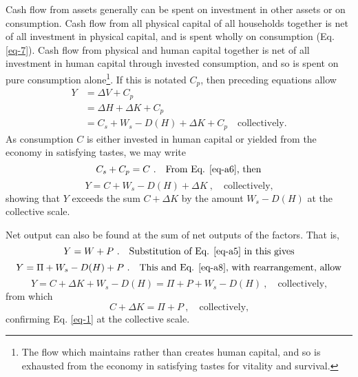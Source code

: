 \documentclass[a4paper,fleqn]{cas-sc}
\begin{document}
Cash flow from assets generally can be spent on investment in other assets or on consumption. Cash flow from all physical capital of all households together is net of all investment in physical capital, and is spent wholly on consumption (Eq. \eqref{eq-7}). Cash flow from physical and human capital together is net of all investment in human capital through invested consumption, and so is spent on pure consumption alone\footnote{The flow which maintains rather than creates human capital, and so is exhausted from the economy in satisfying tastes for vitality and survival.}. If this is notated $C_p$, then preceding equations allow
\begin{equation}
\begin{aligned}
Y &= \Delta V + C_p \\
&= \Delta H + \Delta K + C_p \\
&= C_s + W_s - D(H) + \Delta K + C_p \quad \text{collectively.} \label{eq-a6}
\end{aligned}
\end{equation}
As consumption $C$ is either invested in human capital or yielded from the economy in satisfying tastes, we may write
\begin{equation}
C_s + C_p = C \ . \quad \text{From Eq. \eqref{eq-a6}, then} \label{eq-a7}
\end{equation}
\vspace{-5ex}
\begin{equation}
Y = C + W_s - D(H) + \Delta K \ , \quad \text{collectively,} \label{eq-a8}
\end{equation}
showing that $Y$ exceeds the sum $C + \Delta K$ by the amount $W_s - D(H)$ at the collective scale.


Net output can also be found at the sum of net outputs of the factors. That is,
\begin{equation}
Y = W + P \ . \quad \text{Substitution of Eq. \eqref{eq-a5} in this gives} \label{eq-a9}
\end{equation}
\vspace{-5ex}
\begin{equation}
Y = \Pi + W_s - D(H) + P \ . \quad \text{This and Eq. \eqref{eq-a8}, with rearrangement, allow} \label{eq-a10}
\end{equation}
\vspace{-5ex}
\begin{equation}
Y = C + \Delta K + W_s - D(H) = \Pi + P + W_s - D(H) \ , \quad \text{collectively,} \label{eq-a11}
\end{equation}
from which
\begin{equation}
C + \Delta K = \Pi + P \ , \quad \text{collectively,} 
\end{equation}
confirming Eq. \eqref{eq-1} at the collective scale.
\end{document}
